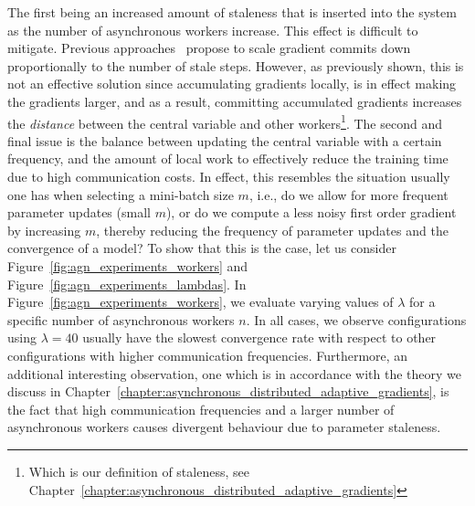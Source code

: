 The first being an increased amount of staleness that is inserted into the system as the number of asynchronous workers increase. This effect is difficult to mitigate. Previous approaches~\cite{jiang2017heterogeneity} propose to scale gradient commits down proportionally to the number of stale steps. However, as previously shown, this is not an effective solution since accumulating gradients locally, is in effect making the gradients larger, and as a result, committing accumulated gradients increases the \emph{distance} between the central variable and other workers\footnote{Which is our definition of staleness, see Chapter~\ref{chapter:asynchronous_distributed_adaptive_gradients}}. The second and final issue is the balance between updating the central variable with a certain frequency, and the amount of local work to effectively reduce the training time due to high communication costs. In effect, this resembles the situation usually one has when selecting a mini-batch size $m$, i.e., do we allow for more frequent parameter updates (small $m$), or do we compute a less noisy first order gradient by increasing $m$, thereby reducing the frequency of parameter updates and the convergence of a model? To show that this is the case, let us consider Figure~\ref{fig:agn_experiments_workers} and Figure~\ref{fig:agn_experiments_lambdas}. In Figure~\ref{fig:agn_experiments_workers}, we evaluate varying values of $\lambda$ for a specific number of asynchronous workers $n$. In all cases, we observe configurations using $\lambda = 40$ usually have the slowest convergence rate with respect to other configurations with higher communication frequencies. Furthermore, an additional interesting observation, one which is in accordance with the theory we discuss in Chapter~\ref{chapter:asynchronous_distributed_adaptive_gradients}, is the fact that high communication frequencies and a larger number of asynchronous workers causes divergent behaviour due to parameter staleness.\\

